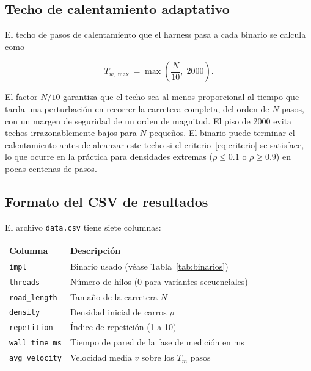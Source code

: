 \subsection{Techo de calentamiento adaptativo}

El techo de pasos de calentamiento que el harness pasa a cada binario se
calcula como

\begin{equation}
    T_{w,\max} = \max\!\left(\frac{N}{10},\; 2000\right).
    \label{eq:techo}
\end{equation}

El factor $N/10$ garantiza que el techo sea al menos proporcional al
tiempo que tarda una perturbación en recorrer la carretera completa, del
orden de $N$ pasos, con un margen de seguridad de un orden de magnitud.
El piso de 2000 evita techos irrazonablemente bajos para $N$ pequeños.
El binario puede terminar el calentamiento antes de alcanzar este techo si
el criterio~\eqref{eq:criterio} se satisface, lo que ocurre en la
práctica para densidades extremas ($\rho \leq 0.1$ o $\rho \geq 0.9$) en
pocas centenas de pasos.


\subsection{Formato del CSV de resultados}

El archivo \texttt{data.csv} tiene siete columnas:

\begin{center}
\begin{tabular}{ll}
\hline
Columna & Descripción \\
\hline
\texttt{impl}          & Binario usado (véase Tabla~\ref{tab:binarios}) \\
\texttt{threads}       & Número de hilos (0 para variantes secuenciales) \\
\texttt{road\_length}  & Tamaño de la carretera $N$ \\
\texttt{density}       & Densidad inicial de carros $\rho$ \\
\texttt{repetition}    & Índice de repetición (1 a 10) \\
\texttt{wall\_time\_ms} & Tiempo de pared de la fase de medición en ms \\
\texttt{avg\_velocity} & Velocidad media $\bar{v}$ sobre los $T_m$ pasos \\
\hline
\end{tabular}
\end{center}
